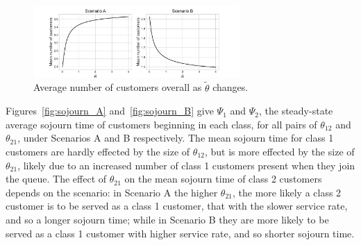 \documentclass{article}
\begin{document}
\begin{figure}
  \begin{center}
    \includegraphics[width=0.7\textwidth]{img/mean_custs_equal_theta_overall.pdf}
  \end{center}
  \caption{Average number of customers overall as $\tilde{\theta}$ changes.}
  \label{fig:theta_magnitude_overall}
\end{figure}

Figures~\ref{fig:sojourn_A} and~\ref{fig:sojourn_B} give $\Psi_1$ and $\Psi_2$,
the steady-state average sojourn time of customers beginning in each class, for
all pairs of $\theta_{12}$ and $\theta_{21}$, under Scenarios A and B
respectively. The mean sojourn time for class 1 customers are hardly effected by
the size of $\theta_{12}$, but is more effected by the size of $\theta_{21}$,
likely due to an increased number of class 1 customers present when they join
the queue. The effect of $\theta_{21}$ on the mean sojourn time of class 2
customers depends on the scenario: in Scenario A the higher $\theta_{21}$, the
more likely a class 2 customer is to be served as a class 1 customer, that with
the slower service rate, and so a longer sojourn time; while in Scenario B they
are more likely to be served as a class 1 customer with higher service rate, and
so shorter sojourn time.
\end{document}
